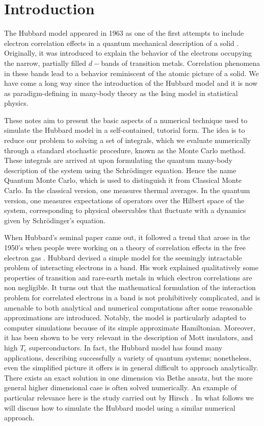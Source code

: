 \section{Introduction}
\label{sec:intro}

The Hubbard model appeared in 1963 as one of the first attempts to include electron correlation effects in a quantum mechanical description of a solid \cite{Hubbard1963}. Originally, it was introduced to explain the behavior of the electrons occupying the narrow, partially filled $d-$bands of transition metals. Correlation phenomena in these bands lead to a behavior reminiscent of the atomic picture of a solid. We have come a long way since the introduction of the Hubbard model and it is now as paradigm-defining in many-body theory as the Ising model in statistical physics\cite{Mahan2000}.

These notes aim to present the basic aspects of a numerical technique used to simulate the Hubbard model in a self-contained, tutorial form. The idea is to reduce our problem to solving a set of integrals, which we evaluate numerically through a standard stochastic procedure, known as the Monte Carlo method. These integrals are arrived at upon formulating the quantum many-body description of the system using the Schr\"odinger equation. Hence the name Quantum Monte Carlo, which is used to distinguish it from Classical Monte Carlo. In the classical version, one measures thermal averages. In the quantum version, one measures expectations of operators over the Hilbert space of the system, corresponding to physical observables that fluctuate with a dynamics given by Schr\"odinger's equation.

When Hubbard's seminal paper came out, it followed a trend that arose in the 1950's when people were working on a theory of correlation effects in the free electron gas \cite{Bohm1953, Gell-Mann1957, Sawada1957, Hubbard1957, Hubbard1958, Nozieres1958}. Hubbard devised a simple model for the seemingly intractable problem of interacting electrons in a band. His work explained qualitatively some properties of transition and rare-earth metals in which electron correlations are non negligible. It turns out that the mathematical formulation of the interaction problem for correlated electrons in a band is not prohibitively complicated, and is amenable to both analytical and numerical computations after some reasonable approximations are introduced. Notably, the model is particularly adapted to computer simulations because of its simple approximate Hamiltonian. Moreover, it has been shown to be very relevant in the description of Mott insulators, and high $T_c$ superconductors. In fact, the Hubbard model has found many applications, describing successfully a variety of quantum systems\cite{Editorial2013}; nonetheless, even the simplified picture it offers is in general difficult to approach analytically. There exists an exact solution in one dimension via Bethe ansatz\cite{Lieb1968}, but the more general higher dimensional case is often solved numerically. An example of particular relevance here is the study carried out by Hirsch \cite{Hirsch1985}. In what follows we will discuss how to simulate the Hubbard model using a similar numerical approach.

